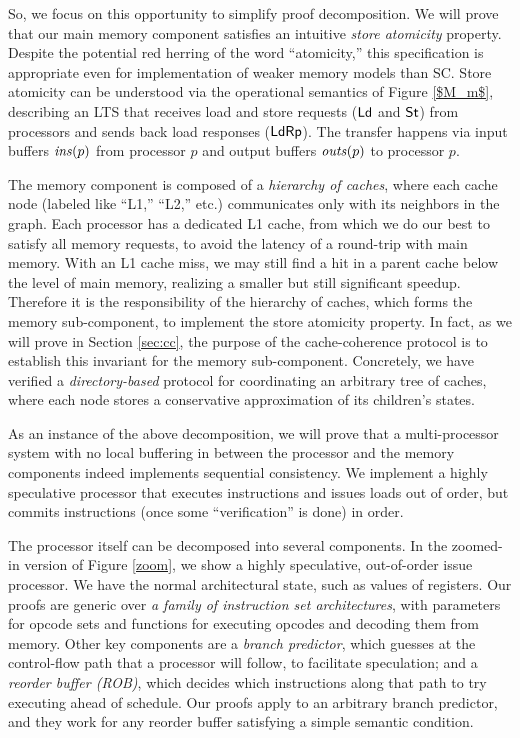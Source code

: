 So, we focus on this opportunity to simplify proof decomposition.  We will
prove that our main memory component satisfies an intuitive \emph{store
atomicity} property.  Despite the potential red herring of the word
``atomicity,'' this specification is appropriate even for implementation of
weaker memory models than SC.  Store atomicity can be understood via the
operational semantics of Figure \ref{$M_m$}, describing an LTS that receives
load and store requests ($\mathsf{Ld}$ and $\mathsf{St}$) from processors and sends back load
responses ($\mathsf{Ld}\mathsf{Rp}$). The transfer happens via input buffers $\mathit{ins}(p)$ from
processor $p$ and output buffers $\mathit{outs}(p)$ to processor $p$.

The memory component is composed of a \emph{hierarchy of caches}, where each
cache node (labeled like ``L1,'' ``L2,'' etc.) communicates only with its
neighbors in the graph.  Each processor has a dedicated L1 cache, from which we
do our best to satisfy all memory requests, to avoid the latency of a
round-trip with main memory.  With an L1 cache miss, we may still find a hit in
a parent cache below the level of main memory, realizing a smaller but still
significant speedup.  Therefore it is the responsibility of the hierarchy of
caches, which forms the memory sub-component, to implement the store atomicity
property. In fact, as we will prove in Section \ref{sec:cc}, the purpose of the
cache-coherence protocol is to establish this invariant for the memory
sub-component.  Concretely, we have verified a \emph{directory-based} protocol
for coordinating an arbitrary tree of caches, where each node stores a
conservative approximation of its children's states.

As an instance of the above decomposition, we will prove that a multi-processor
system with no local buffering in between the processor and the memory
components indeed implements sequential consistency. We implement a highly
speculative processor that executes instructions and issues loads out of
order, but commits instructions (once some ``verification'' is done) in order.

The processor itself can be decomposed into several components. In the zoomed-in
version of Figure \ref{zoom}, we show a highly speculative, out-of-order
issue processor. We have the normal architectural state, such as values of
registers.  Our proofs are generic over \emph{a family of instruction set
architectures}, with parameters for opcode sets and functions for executing
opcodes and decoding them from memory.  Other key components are a \emph{branch
predictor}, which guesses at the control-flow path that a processor will
follow, to facilitate speculation; and a \emph{reorder buffer (ROB)}, which
decides which instructions along that path to try executing ahead of schedule.
Our proofs apply to an arbitrary branch predictor, and they work for any
reorder buffer satisfying a simple semantic condition.

